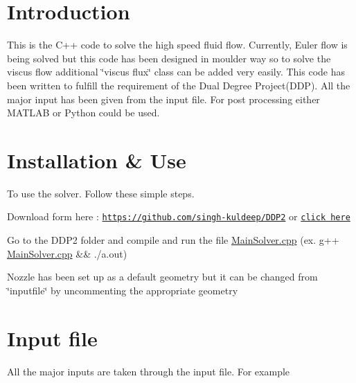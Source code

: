 \hypertarget{index_intro_sec}{}\section{Introduction}\label{index_intro_sec}
This is the C++ code to solve the high speed fluid flow. Currently, Euler flow is being solved but this code has been designed in moulder way so to solve the viscus flow additional \char`\"{}viscus flux\char`\"{} class can be added very easily. This code has been written to fulfill the requirement of the Dual Degree Project(\+D\+D\+P). All the major input has been given from the input file. For post processing either M\+A\+T\+L\+AB or Python could be used.\hypertarget{index_install_sec}{}\section{Installation \& Use}\label{index_install_sec}
To use the solver. Follow these simple steps.
\begin{DoxyItemize}
\item Download form here \+: \href{https://github.com/singh-kuldeep/DDP2}{\tt https\+://github.\+com/singh-\/kuldeep/\+D\+D\+P2} or \href{https://github.com/singh-kuldeep/DDP2}{\tt click here}
\item Go to the D\+D\+P2 folder and compile and run the file \hyperlink{MainSolver_8cpp}{Main\+Solver.\+cpp} (ex. g++ \hyperlink{MainSolver_8cpp}{Main\+Solver.\+cpp} \&\& ./a.out)
\item Nozzle has been set up as a default geometry but it can be changed from \char`\"{}inputfile\char`\"{} by uncommenting the appropriate geometry
\end{DoxyItemize}\hypertarget{index_input}{}\section{Input file}\label{index_input}
All the major inputs are taken through the input file. For example


